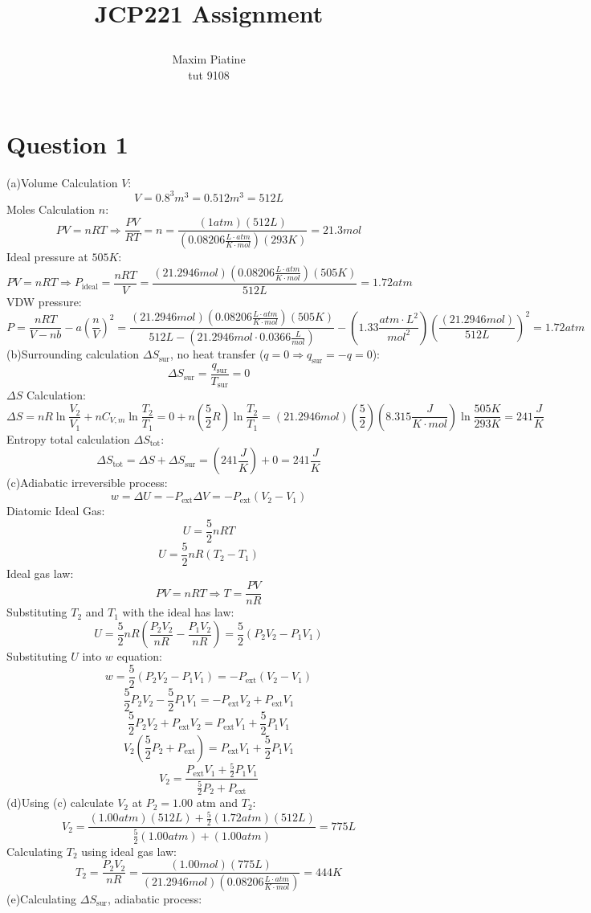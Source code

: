 \documentclass[11pt]{article}
\title{\textbf{JCP221 Assignment}
\author{Maxim Piatine\\tut 9108}}
\date{}
\begin{document}
\maketitle
\section*{Question 1}
(a)Volume Calculation $V$:
\[V=0.8^3m^3=0.512m^3=512L\]
Moles Calculation $n$:
\[PV=nRT \Rightarrow \frac{PV}{RT}=n=\frac{(1atm)(512 L)}{(0.08206\frac{L\cdot atm}{K\cdot mol})(293K)}=21.3 mol\]
Ideal pressure at $505K$:
\[PV=nRT \Rightarrow P_{\text{ideal}}=\frac{nRT}{V}=\frac{(21.2946 mol)(0.08206 \frac{L\cdot atm}{K\cdot mol})(505 K)}{512L}=1.72atm\]
VDW pressure:
\[P=\frac{nRT}{V-nb}-a(\frac{n}{V})^2=\frac{(21.2946mol)(0.08206\frac{L\cdot atm}{K\cdot mol})(505K)}{512L-(21.2946mol\cdot  0.0366\frac{L}{mol})}-(1.33\frac{atm\cdot L^2}{mol^2})(\frac{(21.2946mol)}{512L})^2=1.72atm\]
(b)Surrounding calculation $\Delta S_{\text{sur}}$, no heat transfer ($q=0 \Rightarrow q_{\text{sur}}=-q=0$):
\[\Delta S_{\text{sur}}=\frac{q_{\text{sur}}}{T_{\text{sur}}}=0\]
$\Delta S$ Calculation:
\[\Delta S=nR\ln{\frac{V_2}{V_1}}+nC_{V,m}\ln{\frac{T_2}{T_1}}= 0+n(\frac{5}{2}R)\ln{\frac{T_2}{T_1}}=(21.2946mol)(\frac{5}{2})(8.315\frac{J}{K\cdot mol})\ln{\frac{505K}{293K}}=241\frac{J}{K}\]
Entropy total calculation $\Delta S_{\text{tot}}$:
\[\Delta S_{\text{tot}}=\Delta S+\Delta S_{\text{sur}}=(241\frac{J}{K})+0=241\frac{J}{K}\]
(c)Adiabatic irreversible process:
\[w=\Delta U=-P_{\text{ext}}\Delta V=-P_{\text{ext}}(V_2-V_1)\]
Diatomic Ideal Gas:
\[U=\frac{5}{2}nRT\]
\[U=\frac{5}{2}nR(T_2-T_1)\]
Ideal gas law:
\[PV=nRT \Rightarrow T=\frac{PV}{nR}\]
Substituting $T_2$ and $T_1$ with the ideal has law:
\[U=\frac{5}{2}nR(\frac{P_2V_2}{nR}-\frac{P_1V_2}{nR})=\frac{5}{2}(P_2V_2-P_1V_1)\]
Substituting $U$ into $w$ equation:
\[w=\frac{5}{2}(P_2V_2-P_1V_1)=-P_{\text{ext}}(V_2-V_1)\]
\[\frac{5}{2}P_2V_2-\frac{5}{2}P_1V_1=-P_{\text{ext}}V_2+P_{\text{ext}}V_1\]
\[\frac{5}{2}P_2V_2+P_{\text{ext}}V_2=P_{\text{ext}}V_1+\frac{5}{2}P_1V_1\]
\[V_2(\frac{5}{2}P_2+P_{\text{ext}})=P_{\text{ext}}V_1+\frac{5}{2}P_1V_1\]
\[V_2=\frac{P_{\text{ext}}V_1+\frac{5}{2}P_1V_1}{\frac{5}{2}P_2+P_{\text{ext}}}\]
(d)Using (c) calculate $V_2$ at $P_2=1.00$ atm and $T_2$:
\[V_2=\frac{(1.00 atm)(512L)+\frac{5}{2}(1.72 atm)(512 L)}{\frac{5}{2}(1.00 atm)+(1.00 atm)}=775L\]
Calculating $T_2$ using ideal gas law:
\[T_2=\frac{P_2V_2}{nR}=\frac{(1.00 mol)(775 L)}{(21.2946 mol)(0.08206 \frac{L\cdot atm}{K\cdot mol})}=444K\]
(e)Calculating $\Delta S_{\text{sur}}$, adiabatic process:
\end{document}
